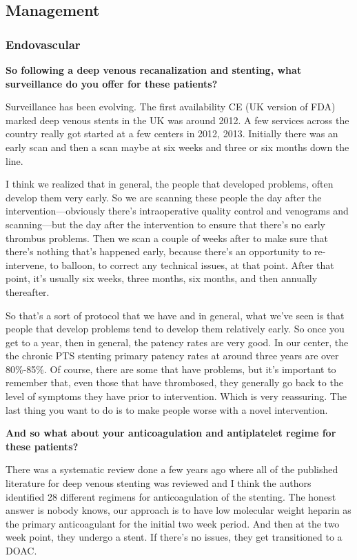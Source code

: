\documentclass[
]{book}
\begin{document}
\hypertarget{management-31}{%
\subsection{Management}\label{management-31}}

\hypertarget{endovascular-1}{%
\subsubsection{Endovascular}\label{endovascular-1}}

\textbf{So following a deep venous recanalization and stenting, what
surveillance do you offer for these patients?}

Surveillance has been evolving. The first availability CE (UK version of
FDA) marked deep venous stents in the UK was around 2012. A few services
across the country really got started at a few centers in 2012, 2013.
Initially there was an early scan and then a scan maybe at six weeks and
three or six months down the line.

I think we realized that in general, the people that developed problems,
often develop them very early. So we are scanning these people the day
after the intervention---obviously there's intraoperative quality
control and venograms and scanning---but the day after the intervention
to ensure that there's no early thrombus problems. Then we scan a couple
of weeks after to make sure that there's nothing that's happened early,
because there's an opportunity to re-intervene, to balloon, to correct
any technical issues, at that point. After that point, it's usually six
weeks, three months, six months, and then annually thereafter.

So that's a sort of protocol that we have and in general, what we've
seen is that people that develop problems tend to develop them
relatively early. So once you get to a year, then in general, the
patency rates are very good. In our center, the the chronic PTS stenting
primary patency rates at around three years are over 80\%-85\%. Of course,
there are some that have problems, but it's important to remember that,
even those that have thrombosed, they generally go back to the level of
symptoms they have prior to intervention. Which is very reassuring. The
last thing you want to do is to make people worse with a novel
intervention.

\textbf{And so what about your anticoagulation and antiplatelet regime for
these patients?}

There was a systematic review done a few years ago where all of the
published literature for deep venous stenting was reviewed and I think
the authors identified 28 different regimens for anticoagulation of the
stenting.\citep{notten2021} The honest answer is nobody knows, our approach
is to have low molecular weight heparin as the primary anticoagulant for
the initial two week period. And then at the two week point, they
undergo a stent. If there's no issues, they get transitioned to a DOAC.
\end{document}
